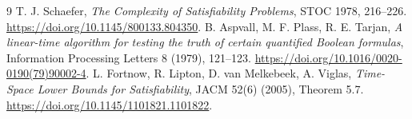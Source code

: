 \documentclass[11pt]{article}
\begin{document}
\begin{thebibliography}{9}
 T. J. Schaefer, \emph{The Complexity of Satisfiability Problems}, STOC 1978, 216--226. \url{https://doi.org/10.1145/800133.804350}.
 B. Aspvall, M. F. Plass, R. E. Tarjan, \emph{A linear-time algorithm for testing the truth of certain quantified Boolean formulas}, Information Processing Letters 8 (1979), 121--123. \url{https://doi.org/10.1016/0020-0190(79)90002-4}.
 L. Fortnow, R. Lipton, D. van Melkebeek, A. Viglas, \emph{Time-Space Lower Bounds for Satisfiability}, JACM 52(6) (2005), Theorem 5.7. \url{https://doi.org/10.1145/1101821.1101822}.
\end{thebibliography}
\end{document}
